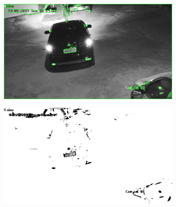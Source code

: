 \begin{figure}[H]
     \centering
     
     \begin{subfigure}{0.7\textwidth}
         \includegraphics[width=\textwidth]{figuras/img_origin_n.jpg}
         \caption{}
         \label{fig1:demarcada}
     \end{subfigure}

     \begin{subfigure}{0.7\textwidth}
         \includegraphics[width=\textwidth]{figuras/thr_n.jpg}
          \caption{}
         \label{fig2:thresh}
     \end{subfigure}

  
\end{figure}

